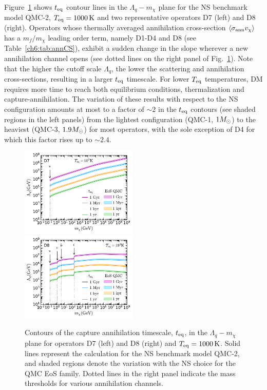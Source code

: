 Figure~\ref{ch6:fig:ann_xs_plots} shows $t_{\rm eq}$ contour lines in the $\Lambda_q-m_\chi$ plane for the NS benchmark model QMC-2, $T_{\rm eq}=1000{\rm \,K}$ and two representative operators D7 (left) and D8 (right). 
Operators whose thermally averaged annihilation cross-section $\langle \sigma_{\rm ann} v_\chi \rangle$ has a  $m_f/m_\chi$ leading order term, namely D1-D4 and D8 (see Table~\ref{ch6:tab:annCS}), exhibit a sudden change in the slope wherever a new annihilation channel opens (see dotted lines on the right panel of Fig.~\ref{ch6:fig:ann_xs_plots}). Note that the higher the cutoff scale $\Lambda_q$, the lower the scattering and annihilation cross-sections, resulting in a larger $t_{\rm eq}$ timescale. For lower $T_{\rm eq}$ temperatures, DM requires more time to reach both equilibrium conditions, thermalization and capture-annihilation. The variation of these results with respect to the NS configuration amounts at most to a factor of $\sim2$ in the $t_{\rm eq}$ contours (see shaded regions in the left panels) from the lightest configuration (QMC-1, $1M_\odot$) to the heaviest (QMC-3, $1.9M_\odot$) for most operators, with the sole exception of D4 for which this factor rises up to $\sim 2.4$. 

\begin{figure}[t!bp]
    \centering
    \includegraphics[width = 0.496\textwidth]{D7_Lambda_mdm_teq.pdf}
    \includegraphics[width = 0.496\textwidth]{D8_Lambda_mdm_teq.pdf}    
    \caption{
    Contours of the capture annihilation timescale, $t_{\rm eq}$,  in the $\Lambda_q-m_\chi$ plane for operators D7 (left) and D8 (right) and $T_{\rm eq}=1000{\rm \,K}$. 
    Solid lines represent the calculation for the NS benchmark model QMC-2, and shaded regions denote the variation with the NS choice for the QMC EoS family. 
    Dotted lines in the right panel indicate the mass thresholds for various annihilation channels.  
    }
    \label{ch6:fig:ann_xs_plots}
\end{figure}


